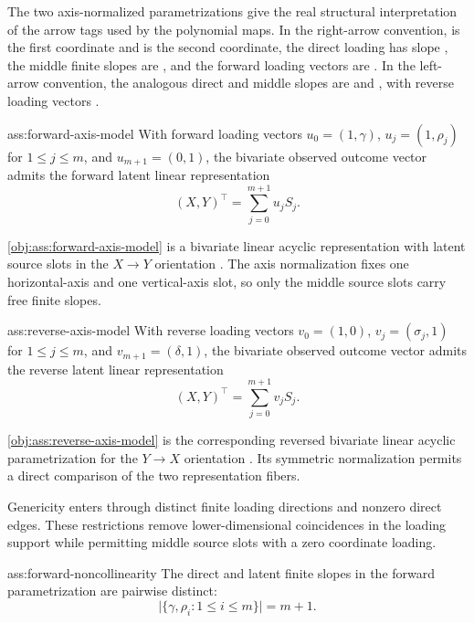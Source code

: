 \documentclass[11pt]{article}
\begin{document}
The two axis-normalized parametrizations give the real structural interpretation of the arrow tags used by the polynomial maps. In the right-arrow convention,  is the first coordinate and  is the second coordinate, the direct loading has slope , the middle finite slopes are , and the forward loading vectors are . In the left-arrow convention, the analogous direct and middle slopes are  and , with reverse loading vectors .

\begin{assumptionv}{ass:forward-axis-model}
With forward loading vectors \(u_0=(1,\gamma)\), \(u_j=(1,\rho_j)\) for \(1\le j\le m\), and \(u_{m+1}=(0,1)\), the bivariate observed outcome vector admits the forward latent linear representation
\[
(X,Y)^\top=\sum_{j=0}^{m+1} u_j S_j .
\]
\end{assumptionv}

\cref{obj:ass:forward-axis-model} is a bivariate linear acyclic representation with latent source slots in the \(X\to Y\) orientation \citep{ChenPengHuangEtAl2025Direction}. The axis normalization fixes one horizontal-axis and one vertical-axis slot, so only the middle source slots carry free finite slopes.

\begin{assumptionv}{ass:reverse-axis-model}
With reverse loading vectors \(v_0=(1,0)\), \(v_j=(\sigma_j,1)\) for \(1\le j\le m\), and \(v_{m+1}=(\delta,1)\), the bivariate observed outcome vector admits the reverse latent linear representation
\[
(X,Y)^\top=\sum_{j=0}^{m+1} v_j S_j .
\]
\end{assumptionv}

\cref{obj:ass:reverse-axis-model} is the corresponding reversed bivariate linear acyclic parametrization for the \(Y\to X\) orientation \citep{ChenPengHuangEtAl2025Direction}. Its symmetric normalization permits a direct comparison of the two representation fibers.

Genericity enters through distinct finite loading directions and nonzero direct edges. These restrictions remove lower-dimensional coincidences in the loading support while permitting middle source slots with a zero coordinate loading.

\begin{assumptionv}{ass:forward-noncollinearity}
The direct and latent finite slopes in the forward parametrization are pairwise distinct:
\[
\bigl|\{\gamma,\rho_i:1\le i\le m\}\bigr|=m+1 .
\]
\end{assumptionv}
\end{document}
